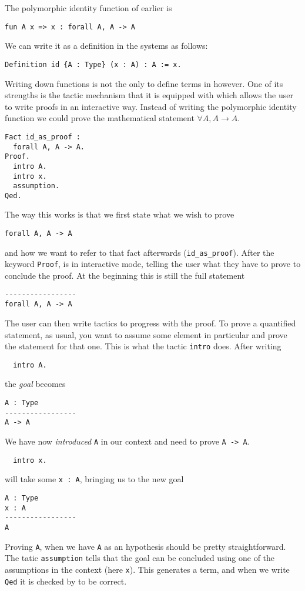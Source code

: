 The polymorphic identity function of earlier is
\begin{verbatim}
fun A x => x : forall A, A -> A
\end{verbatim}
We can write it as a definition in the systems as follows:
\begin{verbatim}
Definition id {A : Type} (x : A) : A := x.
\end{verbatim}

Writing down functions is not the only to define terms in \Coq however. One of
its strengths is the tactic mechanism that it is equipped with which allows the
user to write proofs in an interactive way.
Instead of writing the polymorphic identity function we could prove the
mathematical statement \(\forall A, A \to A\).
\begin{verbatim}
Fact id_as_proof :
  forall A, A -> A.
Proof.
  intro A.
  intro x.
  assumption.
Qed.
\end{verbatim}
The way this works is that we first state what we wish to prove
\begin{verbatim}
forall A, A -> A
\end{verbatim}
and how we want to refer to that fact afterwards
(\texttt{id_as_proof}).
After the keyword \texttt{Proof}, \Coq is in interactive mode,
telling the user what they have to prove to conclude the proof.
At the beginning this is still the full statement
\begin{verbatim}
-----------------
forall A, A -> A
\end{verbatim}
The user can then write tactics to progress with the proof. To prove a
quantified statement, as usual, you want to assume some element in particular
and prove the statement for that one. This is what the tactic
\texttt{intro} does.
After writing
\begin{verbatim}
  intro A.
\end{verbatim}
the \emph{goal} becomes
\begin{verbatim}
A : Type
-----------------
A -> A
\end{verbatim}
We have now \emph{introduced} \texttt{A} in our context and need to
prove \texttt{A -> A}.
\begin{verbatim}
  intro x.
\end{verbatim}
will take some \texttt{x : A}, bringing us to the new goal
\begin{verbatim}
A : Type
x : A
-----------------
A
\end{verbatim}
Proving \texttt{A}, when we have \texttt{A} as an hypothesis
should be pretty straightforward. The tatic \texttt{assumption}
tells \Coq that the goal can be concluded using one of the assumptions in the
context (here \texttt{x}).
This generates a term, and when we write \texttt{Qed} it is checked
by \Coq to be correct.

